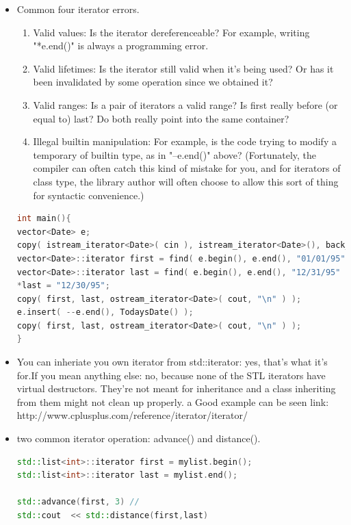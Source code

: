 \documentclass[a4paper,12pt,twoside]{book}
\begin{document}
\begin{itemize}
\item Common four iterator errors.
\begin{enumerate}
\item Valid values: Is the iterator dereferenceable? For example, writing "*e.end()" is always a programming error.
\item Valid lifetimes: Is the iterator still valid when it's being used? Or has it been invalidated by some
operation since we obtained it?

\item Valid ranges: Is a pair of iterators a valid range? Is first really before (or equal to) last? Do
both really point into the same container?
\item Illegal builtin manipulation: For example, is the code trying to modify a temporary of builtin
type, as in "--e.end()" above? (Fortunately, the compiler can often catch this kind of mistake
for you, and for iterators of class type, the library author will often choose to allow this sort of
thing for syntactic convenience.)


\end{enumerate}


\begin{lstlisting}[frame=single, language=c++]
int main(){
vector<Date> e;
copy( istream_iterator<Date>( cin ), istream_iterator<Date>(), back_inserter( e ) );
vector<Date>::iterator first = find( e.begin(), e.end(), "01/01/95" );
vector<Date>::iterator last = find( e.begin(), e.end(), "12/31/95" );
*last = "12/30/95";
copy( first, last, ostream_iterator<Date>( cout, "\n" ) );
e.insert( --e.end(), TodaysDate() );
copy( first, last, ostream_iterator<Date>( cout, "\n" ) );
}
\end{lstlisting}


\item You can inheriate you own iterator from std::iterator: yes, that's what it's for.If you mean anything else: no, because none of the STL iterators have virtual destructors. They're not meant for inheritance and a class inheriting from them might not clean up properly. a Good example can be seen link:  http://www.cplusplus.com/reference/iterator/iterator/

\item two common iterator operation:  advance() and distance().
\begin{lstlisting}[frame=single, language=c++]
std::list<int>::iterator first = mylist.begin();
std::list<int>::iterator last = mylist.end();

std::advance(first, 3) //
std::cout  << std::distance(first,last)
\end{lstlisting}



\end{itemize}
\end{document}
